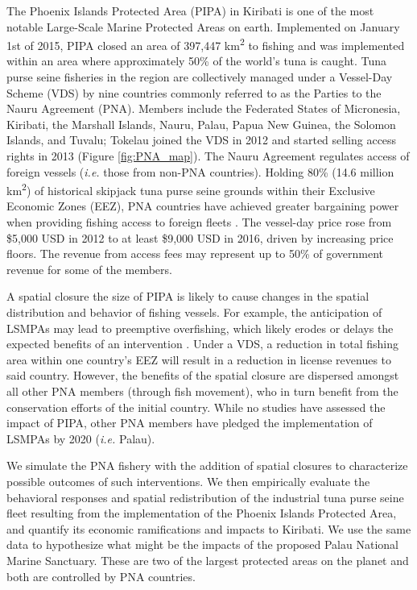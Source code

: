 \documentclass[9p,twocolumn,twoside,lineno]{pnas-new}
\begin{document}
The Phoenix Islands Protected Area (PIPA) in Kiribati is one of the most notable Large-Scale Marine Protected Areas on earth. Implemented on January 1st of 2015, PIPA closed an area of 397,447 km\textsuperscript{2} to fishing and was implemented within an area where approximately 50\% of the world's tuna is caught. Tuna purse seine fisheries in the region are collectively managed under a Vessel-Day Scheme (VDS) by nine countries commonly referred to as the Parties to the Nauru Agreement (PNA). Members include the Federated States of Micronesia, Kiribati, the Marshall Islands, Nauru, Palau, Papua New Guinea, the Solomon Islands, and Tuvalu; Tokelau joined the VDS in 2012 and started selling access rights in 2013 (Figure \ref{fig:PNA_map}). The Nauru Agreement regulates access of foreign vessels (\emph{i.e.} those from non-PNA countries). Holding 80\% (14.6 million km\textsuperscript{2}) of historical skipjack tuna purse seine grounds within their Exclusive Economic Zones (EEZ), PNA countries have achieved greater bargaining power when providing fishing access to foreign fleets \cite{havice_2010}. The vessel-day price rose from \$5,000 USD in 2012 to at least \$9,000 USD in 2016, driven by increasing price floors. The revenue from access fees may represent up to 50\% of government revenue for some of the members.

A spatial closure the size of PIPA is likely to cause changes in the spatial distribution and behavior of fishing vessels. For example, the anticipation of LSMPAs may lead to preemptive overfishing, which likely erodes or delays the expected benefits of an intervention \cite{mcdermott_2018,hanich2018unraveling}. Under a VDS, a reduction in total fishing area within one country's EEZ will result in a reduction in license revenues to said country. However, the benefits of the spatial closure are dispersed amongst all other PNA members (through fish movement), who in turn benefit from the conservation efforts of the initial country. While no studies have assessed the impact of PIPA, other PNA members have pledged the implementation of LSMPAs by 2020 (\emph{i.e.} Palau).

We simulate the PNA fishery with the addition of spatial closures to characterize possible outcomes of such interventions. We then empirically evaluate the behavioral responses and spatial redistribution of the industrial tuna purse seine fleet resulting from the implementation of the Phoenix Islands Protected Area, and quantify its economic ramifications and impacts to Kiribati. We use the same data to hypothesize what might be the impacts of the proposed Palau National Marine Sanctuary. These are two of the largest protected areas on the planet and both are controlled by PNA countries.
\end{document}
